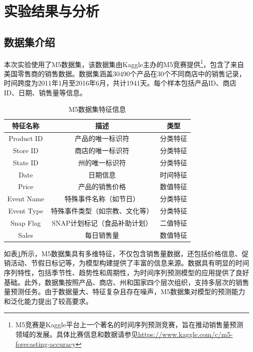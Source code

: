 \documentclass[12pt]{article}
\begin{document}
\newpage

\section{实验结果与分析}
\subsection{数据集介绍}
本次实验使用了M5数据集，该数据集由Kaggle主办的M5竞赛提供\footnote{M5竞赛是Kaggle平台上一个著名的时间序列预测竞赛，旨在推动销售量预测领域的发展。具体比赛信息和数据请参见\url{https://www.kaggle.com/c/m5-forecasting-accuracy}}，包含了来自美国零售商的销售数据。数据集涵盖30490个产品在30个不同商店中的销售记录，时间跨度为2011年1月至2016年6月，共计1941天。每个样本包括产品ID、商店ID、日期、销售量等信息。

\begin{table}[H]
    \centering
    \caption{M5数据集特征信息}
    \label{tab:M5_features}
    \begin{tabular}{|c|c|c|}
        \hline
        \textbf{特征名称} & \textbf{描述} & \textbf{类型} \\
        \hline
        Product ID & 产品的唯一标识符 & 分类特征 \\
        \hline
        Store ID & 商店的唯一标识符 & 分类特征 \\
        \hline
        State ID & 州的唯一标识符 & 分类特征 \\
        \hline
        Date & 日期信息 & 时间特征 \\
        \hline
        Price & 产品的销售价格 & 数值特征 \\
        \hline
        Event Name & 特殊事件名称（如节日） & 分类特征 \\
        \hline
        Event Type & 特殊事件类型（如宗教、文化等） & 分类特征 \\
        \hline
        Snap Flag & SNAP计划标记（食品补助计划） & 二值特征 \\
        \hline
        Sales & 每日销售量 & 数值特征 \\
        \hline
    \end{tabular}
\end{table}

如表\ref{tab:M5_features}所示，M5数据集具有多维特征，不仅包含销售量数据，还包括价格信息、促销活动、节假日标记等，为模型构建提供了丰富的信息来源。数据具有明显的时间序列特性，包括季节性、趋势性和周期性，为时间序列预测模型的应用提供了良好基础。此外，数据集按照产品、商店、州和国家四个层次组织，支持多层次的销售量预测任务。由于数据量大、特征复杂且存在噪声，M5数据集对模型的预测能力和泛化能力提出了较高要求。
\end{document}
